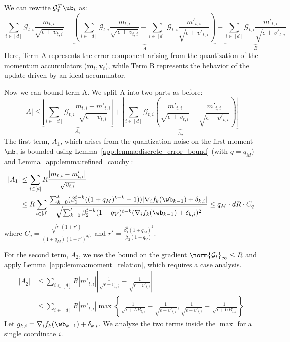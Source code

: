 \documentclass[11pt, letterpaper]{article}
\begin{document}
We can rewrite $\mathcal{G}_t^T \ub_t$ as:
\begin{equation}
\label{eq:fenli}
    \sum_{i\in[d]}\mathcal{G}_{t, i}\frac{m_{t, i}}{\sqrt{\epsilon+v_{t, i}}}=\underbrace{(\sum_{i\in[d]}\mathcal{G}_{t, i}\frac{m_{t, i}}{\sqrt{\epsilon+v_{t, i}}}-\sum_{i\in[d]}\mathcal{G}_{t, i}\frac{m'_{t, i}}{\sqrt{\epsilon+v'_{t, i}}})}_A+\underbrace{\sum_{i\in[d]}\mathcal{G}_{t, i}\frac{m'_{t, i}}{\sqrt{\epsilon+v'_{t, i}}}}_B
\end{equation}
Here, Term A represents the error component arising from the quantization of the momentum accumulators ($\mathbf{m}_t, \mathbf{v}_t$), while Term B represents the behavior of the update driven by an ideal accumulator.

Now we can bound term A. We split A into two parts as before:
\begin{equation}
    |A| \le \underbrace{\left|\sum_{i\in[d]}\mathcal{G}_{t, i}\frac{m_{t, i} - m'_{t,i}}{\sqrt{\epsilon+v_{t, i}}}\right|}_{A_1} + \underbrace{\left|\sum_{i\in[d]}\mathcal{G}_{t, i}\left(\frac{m'_{t, i}}{\sqrt{\epsilon+v_{t, i}}} - \frac{m'_{t, i}}{\sqrt{\epsilon+v'_{t, i}}}\right)\right|}_{A_2}
\end{equation}
The first term, $A_1$, which arises from the quantization noise on the first moment $\mb$, is bounded using Lemma~\ref{app:lemma:discrete_error_bound} (with $q=q_M$) and Lemma~\ref{app:lemma:refined_cauchy}:
\begin{align}
    |A_1| &\le \sum_{i\in[d]}R\frac{|m_{t, i}-m'_{t,i}|}{\sqrt{v_{t, i}}} \nonumber \\
    &\le R\sum_{i\in[d]}\frac{\sum_{k=0}^t(\beta_1^{t-k}((1+q_M)^{t-k}-1))|\nabla_i f_k(\wb_{k-1}) + \delta_{k,i}|}{\sqrt{\sum_{k=0}^t\beta_2^{t-k}(1-q_V)^{t-k}(\nabla_i f_k(\wb_{k-1}) + \delta_{k,i})^2}} \le q_M \cdot dR \cdot C_q
\end{align}
where $C_q = \frac{\sqrt{r'(1+r')}}{(1+q_M)(1-r')^{3/2}}$ and $r' = \frac{\beta_1^2(1+q_M)^2}{\beta_2(1-q_V)}$.

For the second term, $A_2$, we use the bound on the gradient $\norm{\mathcal{G}_t}_\infty \le R$ and apply Lemma~\ref{app:lemma:moment_relation}, which requires a case analysis.
\begin{align}
    \nonumber
    |A_2| &\le \sum_{i\in[d]}R|m'_{t,i}|\left|\frac{1}{\sqrt{\epsilon+v_{t,i}}}-\frac{1}{\sqrt{\epsilon+v'_{t,i}}}\right| \\
    &\le \sum_{i\in[d]}R|m'_{t,i}| \max\left\{ \frac{1}{\sqrt{\epsilon+LB_{t,i}}} - \frac{1}{\sqrt{\epsilon+v'_{t,i}}}, \frac{1}{\sqrt{\epsilon+v'_{t,i}}} - \frac{1}{\sqrt{\epsilon+UB_{t,i}}} \right\}
\end{align}
Let $g_{k,i} = \nabla_i f_k(\wb_{k-1}) + \delta_{k,i}$. We analyze the two terms inside the $\max$ for a single coordinate $i$.
\end{document}
